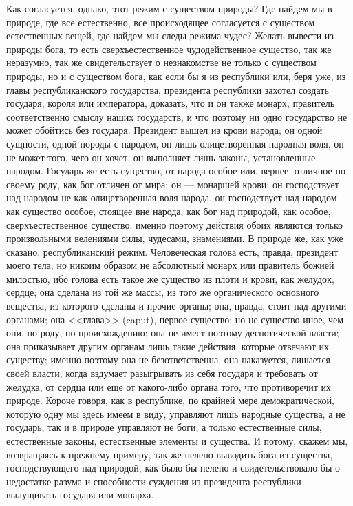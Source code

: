 \documentclass[12pt]{article}
\begin{document}
Как согласуется, однако, этот режим с существом природы? Где найдем мы в природе, где все естественно, все происходящее согласуется с существом естественных вещей, где найдем мы следы режима чудес? Желать вывести из природы бога, то есть сверхъестественное чудодейственное существо, так же неразумно, так же свидетельствует о незнакомстве не только с существом природы, но и с существом бога, как если бы я из республики или, беря уже, из главы республиканского государства, президента республики захотел создать государя, короля или императора, доказать, что и он также монарх, правитель соответственно смыслу наших государств, и что поэтому ни одно государство не может обойтись без государя. Президент вышел из крови народа; он одной сущности, одной породы с народом, он лишь олицетворенная народная воля, он не может того, чего он хочет, он выполняет лишь законы, установленные народом. Государь же есть существо, от народа особое или, вернее, отличное по своему роду, как бог отличен от мира; он --- монаршей крови; он господствует над народом не как олицетворенная воля народа, он господствует над народом как существо особое, стоящее вне народа, как бог над природой, как особое, сверхъестественное существо: именно поэтому действия обоих являются только произвольными велениями силы, чудесами, знамениями. В природе же, как уже сказано, республиканский режим. Человеческая голова есть, правда, президент моего тела, но никоим образом не абсолютный монарх или правитель божией милостью, ибо голова есть такое же существо из плоти и крови, как желудок, сердце; она сделана из той же массы, из того же органического основного вещества, из которого сделаны и прочие органы; она, правда, стоит над другими органами; она <<глава>> (caput), первое существо; но не существо иное, чем они, по роду, по происхождению; она не имеет поэтому деспотической власти; она приказывает другим органам лишь такие действия, которые отвечают их существу; именно поэтому она не безответственна, она наказуется, лишается своей власти, когда вздумает разыгрывать из себя государя и требовать от желудка, от сердца или еще от какого-либо органа того, что противоречит их природе. Короче говоря, как в республике, по крайней мере демократической, которую одну мы здесь имеем в виду, управляют лишь народные существа, а не государь, так и в природе управляют не боги, а только естественные силы, естественные законы, естественные элементы и существа. И потому, скажем мы, возвращаясь к прежнему примеру, так же нелепо выводить бога из существа, господствующего над природой, как было бы нелепо и свидетельствовало бы о недостатке разума и способности суждения из президента республики вылущивать государя или монарха. 
\end{document}
